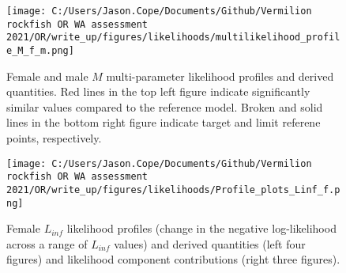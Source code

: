 \documentclass[11pt,
  english,
  a4paper,
]{article}
\begin{document}
\tagmcend\tagstructend


\begin{figure}
\centering
\texttt{[image: C:/Users/Jason.Cope/Documents/Github/Vermilion rockfish OR WA assessment 2021/OR/write\_up/figures/likelihoods/multilikelihood\_profile\_M\_f\_m.png]}
\caption{Female and male {\(M\)\leavevmode\tagmcend\tagstructend} multi-parameter likelihood profiles and derived quantities. Red lines in the top left figure indicate significantly similar values compared to the reference model. Broken and solid lines in the bottom right figure indicate target and limit referene points, respectively.\label{fig:M-multiprofile-combo}}
\end{figure}

\tagmcend\tagstructend


\begin{figure}
\centering
\texttt{[image: C:/Users/Jason.Cope/Documents/Github/Vermilion rockfish OR WA assessment 2021/OR/write\_up/figures/likelihoods/Profile\_plots\_Linf\_f.png]}
\caption{Female {\(L_{inf}\)\leavevmode\tagmcend\tagstructend} likelihood profiles (change in the negative log-likelihood across a range of {\(L_{inf}\)\leavevmode\tagmcend\tagstructend} values) and derived quantities (left four figures) and likelihood component contributions (right three figures).\label{fig:Linf_F-profile-combo}}
\end{figure}

\tagmcend\tagstructend

\end{document}
